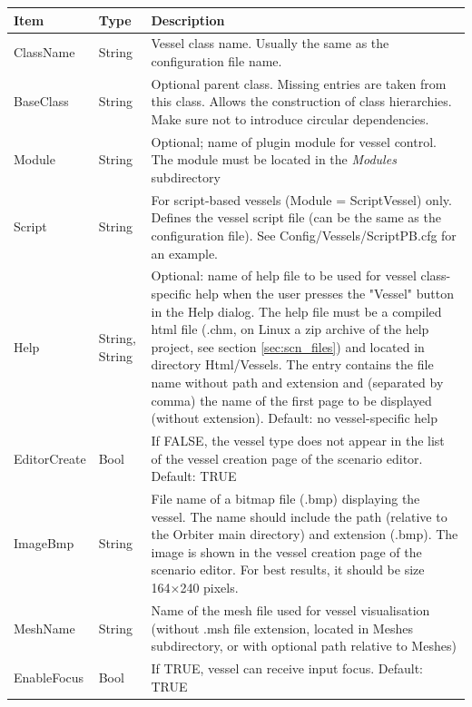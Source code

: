 \documentclass[Orbiter Developer Manual.tex]{subfiles}
\begin{document}
	\begin{longtable}{ |p{}|p{}|p{}| }
	\hline\rule{0pt}{2ex}
	\textbf{Item} & \textbf{Type} & \textbf{Description}\\
	\hline\rule{0pt}{2ex}
	ClassName & String & Vessel class name. Usually the same as the configuration file name.\\
	\hline\rule{0pt}{2ex}
	BaseClass & String & Optional parent class. Missing entries are taken from this class. Allows the construction of class hierarchies. Make sure not to introduce circular dependencies.\\
	\hline\rule{0pt}{2ex}
	Module & String & Optional; name of plugin module for vessel control. The module must be located in the \textit{Modules} subdirectory\\
	\hline\rule{0pt}{2ex}
	Script & String & For script-based vessels (Module = ScriptVessel) only. Defines the vessel script file (can be the same as the configuration file). See Config/Vessels/ScriptPB.cfg for an example.\\
	\hline\rule{0pt}{2ex}
	Help & String, String & Optional: name of help file to be used for vessel class-specific help when the user presses the "Vessel" button in the Help dialog. The help file must be a compiled html file (.chm, on Linux a zip archive of the help project, see section \ref{sec:scn_files}) and located in directory Html/Vessels. The entry contains the file name without path and extension and (separated by comma) the name of the first page to be displayed (without extension). Default: no vessel-specific help\\
	\hline\rule{0pt}{2ex}
	EditorCreate & Bool & If FALSE, the vessel type does not appear in the list of the vessel creation page of the scenario editor. Default: TRUE\\
	\hline\rule{0pt}{2ex}
	ImageBmp & String & File name of a bitmap file (.bmp) displaying the vessel. The name should include the path (relative to the Orbiter main directory) and extension (.bmp). The image is shown in the vessel creation page of the scenario editor. For best results, it should be size 164×240 pixels.\\
	\hline\rule{0pt}{2ex}
	MeshName & String & Name of the mesh file used for vessel visualisation (without .msh file extension, located in Meshes subdirectory, or with optional path relative to Meshes)\\
	\hline\rule{0pt}{2ex}
	EnableFocus & Bool & If TRUE, vessel can receive input focus. Default: TRUE\\

\end{longtable}
\end{document}
